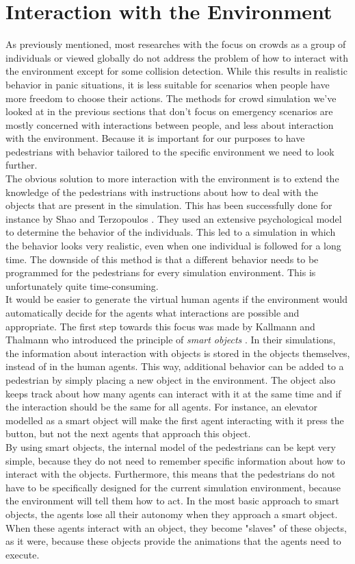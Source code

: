 \documentclass[11pt, a4paper]{book}
\begin{document}
\section{Interaction with the Environment}
As previously mentioned, most researches with the focus on crowds as a group of individuals or viewed globally do not address the problem of how to interact with the environment except for some collision detection. While this results in realistic behavior in panic situations, it is less suitable for scenarios when people have more freedom to choose their actions. The methods for crowd simulation we've looked at in the previous sections that don't focus on emergency scenarios are mostly concerned with interactions between people, and less about interaction with the environment. Because it is important for our purposes to have pedestrians with behavior tailored to the specific environment we need to look further.\\
The obvious solution to more interaction with the environment is to extend the knowledge of the pedestrians with instructions about how to deal with the objects that are present in the simulation. This has been successfully done for instance by Shao and Terzopoulos \cite{A_autonomouspedestrians}. They used an extensive psychological model to determine the behavior of the individuals. This led to a simulation in which the behavior looks very realistic, even when one individual is followed for a long time. The downside of this method is that a different behavior needs to be programmed for the pedestrians for every simulation environment. This is unfortunately quite time-consuming. \\
It would be easier to generate the virtual human agents if the environment would automatically decide for the agents what interactions are possible and appropriate. The first step towards this focus was made by Kallmann and Thalmann who introduced the principle of \textit{smart objects} \cite{Kallmann98modelingobjects}. In their simulations, the information about interaction with objects is stored in the objects themselves, instead of in the human agents. This way, additional behavior can be added to a pedestrian by simply placing a new object in the environment. The object also keeps track about how many agents can interact with it at the same time and if the interaction should be the same for all agents. For instance, an elevator modelled as a smart object will make the first agent interacting with it press the button, but not the next agents that approach this object.\\
By using smart objects, the internal model of the pedestrians can be kept very simple, because they do not need to remember specific information about how to interact with the objects. Furthermore, this means that the pedestrians do not have to be specifically designed for the current simulation environment, because the environment will tell them how to act. In the most basic approach to smart objects, the agents lose all their autonomy when they approach a smart object. When these agents interact with an object, they become "slaves" of these objects, as it were, because these objects provide the animations that the agents need to execute. 
\end{document}
